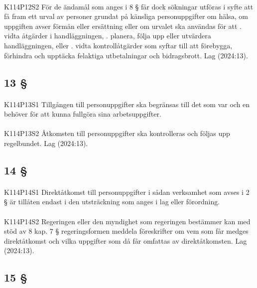 \documentclass[a4paper,notitlepage,openany,10pt]{book}
\begin{document}
\paragraph*{}
{\tiny K114P12S2}
För de ändamål som anges i 8 § får dock sökningar utföras i syfte att få fram ett urval av personer grundat på känsliga personuppgifter om hälsa, om uppgiften avser förmån eller ersättning eller om urvalet ska användas för att
. vidta åtgärder i handläggningen,
. planera, följa upp eller utvärdera handläggningen, eller
. vidta kontrollåtgärder som syftar till att förebygga, förhindra och upptäcka felaktiga utbetalningar och bidragsbrott.
Lag (2024:13).
\subsection*{13 §}
\paragraph*{}
{\tiny K114P13S1}
Tillgången till personuppgifter ska begränsas till det som var och en behöver för att kunna fullgöra sina arbetsuppgifter.
\paragraph*{}
{\tiny K114P13S2}
Åtkomsten till personuppgifter ska kontrolleras och följas upp regelbundet.
Lag (2024:13).
\subsection*{14 §}
\paragraph*{}
{\tiny K114P14S1}
Direktåtkomst till personuppgifter i sådan verksamhet som avses i 2 § är tillåten endast i den utsträckning som anges i lag eller förordning.
\paragraph*{}
{\tiny K114P14S2}
Regeringen eller den myndighet som regeringen bestämmer kan med stöd av 8 kap. 7 § regeringsformen meddela föreskrifter om vem som får medges direktåtkomst och vilka uppgifter som då får omfattas av direktåtkomsten.
Lag (2024:13).
\subsection*{15 §}
\end{document}
